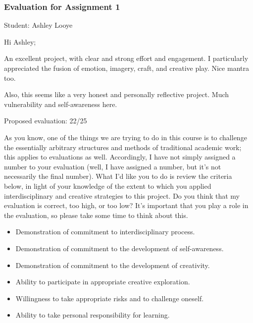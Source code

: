 \documentclass[letterpaper,10pt,DIV=9,headsepline]{scrreprt}
\begin{document}
\newpage

\subsubsection{Evaluation for Assignment 1}

Student: Ashley Looye

\bigskip
Hi Ashley;

An excellent project, with clear and strong effort and engagement. I
particularly appreciated the fusion of emotion, imagery, craft, and
creative play. Nice mantra too.

Also, this seems like a very honest and personally reflective project.
Much vulnerability and self-awareness here.



\bigskip
Proposed evaluation: 22/25

\bigskip
As you know, one of the things we are trying to do in this course is
to challenge the essentially arbitrary structures and methods of
traditional academic work; this applies to evaluations as well.
Accordingly, I have not simply assigned a number to your evaluation
(well, I have assigned a number, but it's not necessarily the final
number). What I'd like you to do is review the criteria below, in
light of your knowledge of the extent to which you applied
interdisciplinary and creative strategies to this project. Do you
think that my evaluation is correct, too high, or too low? It's
important that you play a role in the evaluation, so please take some
time to think about this.

\begin{itemize}
\item Demonstration of commitment to interdisciplinary process.
\item Demonstration of commitment to the development of self-awareness.
\item Demonstration of commitment to the development of creativity.
\item Ability to participate in appropriate creative exploration.
\item Willingness to take appropriate risks and to challenge oneself.
\item Ability to take personal responsibility for learning.
\end{itemize}
\end{document}

